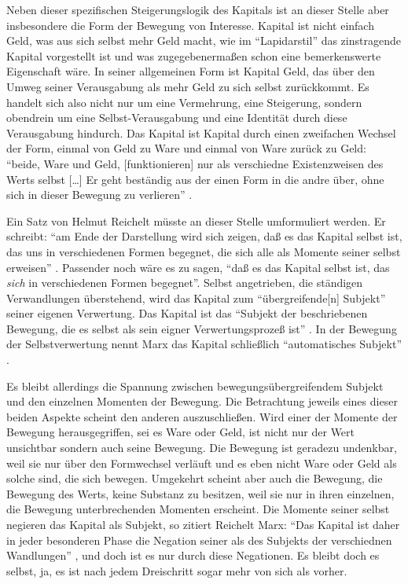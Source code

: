 \documentclass[12pt,
               paper=a4,
               twoside=false,
               onehalfspacing,
               bibliography=totoc,
               toc=graduated,
               ]{scrartcl}
\newcommand{\lips}{\dots\unkern}
\newcommand{\pc}[2]{\parencite[#1]{#2}}
\newcommand{\zn}[3]{\parencite[#1, zit. nach][#2]{#3}}
\begin{document}

Neben dieser spezifischen Steigerungslogik des Kapitals ist an dieser
Stelle aber insbesondere die Form der Bewegung von Interesse. Kapital
ist nicht einfach Geld, was aus sich selbst mehr Geld macht, wie im
"`Lapidarstil"' \pc{170}{kap} das zinstragende Kapital vorgestellt ist
und was zugegebenermaßen schon eine bemerkenswerte Eigenschaft wäre.
In seiner allgemeinen Form ist Kapital Geld, das über den Umweg seiner
Verausgabung als mehr Geld zu sich selbst zurückkommt. Es handelt sich
also nicht nur um eine Vermehrung, eine Steigerung, sondern obendrein
um eine Selbst-Verausgabung und eine Identität durch diese
Verausgabung hindurch. Das Kapital ist Kapital durch einen zweifachen
Wechsel der Form, einmal von Geld zu Ware und einmal von Ware zurück
zu Geld: "`beide, Ware und Geld, [funktionieren] nur als verschiedne
Existenzweisen des Werts selbst [\lips] Er geht beständig aus der
einen Form in die andre über, ohne sich in dieser Bewegung zu
verlieren"' \pc{S. 168 f.}{kap}.


Ein Satz von Helmut Reichelt müsste an dieser Stelle umformuliert
werden. Er schreibt: "`am Ende der Darstellung wird sich zeigen, daß es
das Kapital selbst ist, das uns in verschiedenen Formen begegnet, die
sich alle als Momente seiner selbst erweisen"' \pc{181}{reichelt}.
Passender noch wäre es zu sagen, "`daß es das Kapital selbst ist, das
\emph{sich} in verschiedenen Formen begegnet"'. Selbst angetrieben,
die ständigen Verwandlungen überstehend, wird das Kapital zum
"`übergreifende[n] Subjekt"' \pc{169}{kap} seiner eigenen Verwertung.
Das Kapital ist das "`Subjekt der beschriebenen Bewegung, die es
selbst als sein eigner Verwertungsprozeß ist"'
\zn{Marx}{181}{reichelt}. In der Bewegung der Selbstverwertung nennt
Marx das Kapital schließlich "`automatisches Subjekt"' \pc{169}{kap}.

Es bleibt allerdings die Spannung zwischen bewegungsübergreifendem
Subjekt und den einzelnen Momenten der Bewegung. Die Betrachtung
jeweils eines dieser beiden Aspekte scheint den anderen
auszuschließen. Wird einer der Momente der Bewegung herausgegriffen,
sei es Ware oder Geld, ist nicht nur der Wert unsichtbar sondern auch
seine Bewegung. Die Bewegung ist geradezu undenkbar, weil sie nur über
den Formwechsel verläuft und es eben nicht Ware oder Geld als solche
sind, die sich bewegen. Umgekehrt scheint aber auch die Bewegung, die
Bewegung des Werts, keine Substanz zu besitzen, weil sie nur in ihren
einzelnen, die Bewegung unterbrechenden Momenten erscheint. Die Momente
seiner selbst negieren das Kapital als Subjekt, so zitiert Reichelt
Marx: "`Das Kapital ist daher in jeder besonderen Phase die Negation
seiner als des Subjekts der verschiednen Wandlungen"'
\zn{Marx}{181}{reichelt}, und doch ist es nur durch diese Negationen.
Es bleibt doch es selbst, ja, es ist nach jedem Dreischritt sogar mehr
von sich als vorher.
\end{document}
